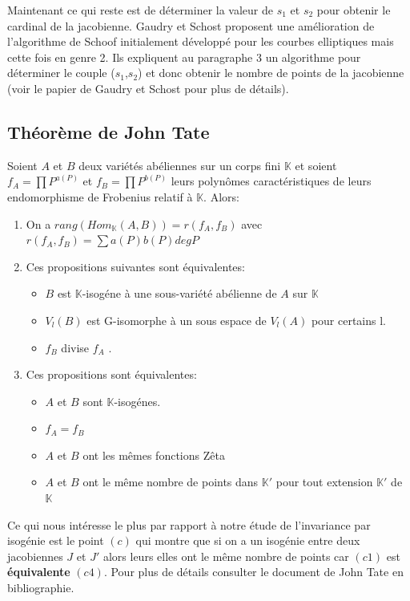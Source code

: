 \documentclass[12pt,a4paper]{article}
\begin{document}
	Maintenant ce qui reste est de déterminer la valeur de $s_1$ et $s_2$ pour obtenir le cardinal de la jacobienne. Gaudry et Schost proposent une amélioration de l'algorithme de Schoof initialement développé pour les courbes elliptiques   mais cette fois en genre 2. Ils expliquent au paragraphe 3 un algorithme pour déterminer le couple ($s_1$,$s_2$) et donc obtenir le nombre de points de la jacobienne (voir le papier de Gaudry et Schost pour plus de détails).
	\subsection{Théorème de John Tate}
	Soient $A$ et $B$ deux variétés abéliennes sur un corps fini $\mathbb{K}$ et soient $f_A = \prod P^{a(P)}$ et $f_B = \prod P^{b(P)}$ leurs polynômes caractéristiques de leurs endomorphisme de Frobenius relatif \`a $\mathbb{K}$. Alors:
	\begin{enumerate}
		\item[(a)] On a $rang(Hom_{\mathbb{K}}(A,B))= r(f_A,f_B)$ avec $r(f_A,f_B) = \sum a(P)b(P)deg P$ 
		\item[(b)] Ces propositions suivantes sont équivalentes:
			\begin{itemize}
				\item [(b1)] $B$ est $\mathbb{K}$-isogéne \`a une sous-variété abélienne de $A$ sur $\mathbb{K}$
				\item[(b2)] $V_l(B)$ est G-isomorphe \`a un sous espace de $V_l(A)$ pour certains l.
				\item[(b3)] $f_B$ divise $f_A$ .
			\end{itemize}
		\item[(c)] Ces propositions sont équivalentes:
			\begin{itemize}
				\item [(c1)] $A$ et $B$ sont $\mathbb{K}$-isogénes.
				\item[(c2)] $f_A = f_B$
				\item[(c3)] $A$ et $B$ ont les mêmes fonctions Zêta 
				\item[(c4)] $A$ et $B$ ont le même nombre de points dans $\mathbb{K'}$ pour tout extension $\mathbb{K'}$ de $\mathbb{K}$    
			\end{itemize} 
	\end{enumerate}
	Ce qui nous intéresse le plus par rapport \`a notre étude de l'invariance par isogénie est le point $(c)$ qui montre que si on a un isogénie entre deux jacobiennes $J$ et $J'$ alors leurs elles ont le même nombre de points car $(c1) $ est \textbf{équivalente} $(c4)$. Pour plus de détails consulter le document de John Tate en bibliographie.
\end{document}
